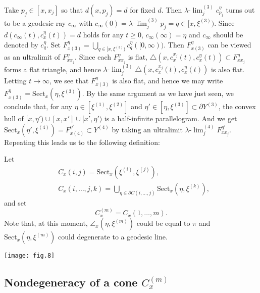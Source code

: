 \documentclass[12pt]{amsart}
\numberwithin{equation}{section}
\theoremstyle{plain}
\theoremstyle{definition}
\theoremstyle{remark}
\newcommand{\uulim}[1][]{\lambda{\text{-}}\!{\lim}^{(#1)}}
\newcommand{\xxi}[1]{\xi^{(#1)}}
\newcommand{\ray}[1]{[#1)}
\newcommand{\cc}[2]{c_{#1}^{#2}}
\newcommand{\tri}[3]{\triangle(#1,#2,#3)}
\newcommand{\sect}[3][]{\mathrm{Sect}_{#1}(#2,#3)}
\newcommand{\cone}[2][]{C_{#1}^{(#2)}}
\begin{document}
 Take $p_j \in [x,x_j]$ so that $d(x,p_j)=d$ for fixed $d$. 
 Then $\uulim[3]_j c_{p_j}^{\eta}$ turns out to be a geodesic ray
 $c_{\infty}$ with $c_{\infty}(0)=\uulim[3]_j p_j = q\in \ray{x, \xxi{3}}$. 
 Since $d(c_{\infty}(t), \cc{x}{\eta}(t))=d$ holds for any $t \geq 0$,  
 $c_{\infty}(\infty)=\eta$ and $c_{\infty}$ should be denoted by
 $c_q^{\eta}$. 
 Set 
 $F_{x(3)}^{\eta}=\bigcup_{q \in \ray{x,\xxi{3}}}
 c_q^{\eta}([0,\infty))$. 
 Then $F_{x(3)}^{\eta}$ can be viewed as an ultralimit of
 $F_{xx_j}^{\eta}$.  
 Since each $F_{xx_j}^{\eta}$ is flat, 
 $\tri{x}{c_{x}^{x_j}(t)}{\cc{x}{\eta}(t)} \subset
 F_{xx_j}^{\eta}$ forms a flat triangle, and hence 
 $\uulim[3]_j \tri{x}{c_{x}^{x_j}(t)}{\cc{x}{\eta}(t)}$ is also flat. 
 Letting $t\to \infty$, we see that 
 $F_{x(3)}^{\eta}$ is also flat, and hence we may write
 $F_{x(3)}^{\eta}=\sect[x]{\eta}{\xxi{3}}$. 
 By the same argument as we have just seen, we conclude that, for any 
 $\eta \in [\xxi{1},\xxi{2}]$ and 
 $\eta' \in [\eta,\xxi{3}]\subset \partial Y^{(3)}$, the convex hull of 
 $\ray{x,\eta'}\cup [x,x'] \cup \ray{x',\eta'}$ is a half-infinite
 parallelogram. And we get 
 $\sect[x]{\eta'}{\xxi{4}}=F_{x(4)}^{\eta'} \subset Y^{(4)}$ by taking
 an ultralimit $\uulim[4]_jF_{xx_j}^{\eta'}$. 
 Repeating this leads us to the following definition:

\noindent
\begin{minipage}[c]{7cm}
  Let
 \begin{equation*}
\begin{split}
  & C_{x}(i,j)=\sect[x]{\xxi{i}}{\xxi{j}}, \\
 & C_{x}(i, \dots, j, k)
 = \bigcup_{\eta \in \partial C(i, \dots, j)} 
    \sect[x]{\eta}{\xxi{k}},
\end{split} 
\end{equation*}
 and set 
 \begin{equation*}
  \cone[x]{m}=C_{x}(1, \dots, m).
 \end{equation*}
 Note that, at this moment, $\angle_{x}(\eta,\xxi{m})$ could be
 equal to $\pi$ and $\sect[x]{\eta}{\xxi{m}}$ could degenerate to
 a geodesic line.
\end{minipage}
\begin{minipage}[c]{6cm}
\hspace{3cm}
\texttt{[image: fig.8]} 
\end{minipage}


\subsection{Nondegeneracy of a cone $\cone[x]{m}$}
\label{sec:nondegeneration_of_cone}
\end{document}
